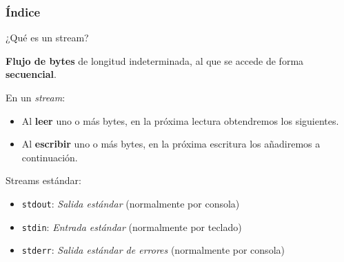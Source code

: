 \documentclass{mybeamer}
\institute{
	{\textsl{\large Tema 10}}
	\\[1em]
	\textbf{\Large Entrada/Salida}
}
\begin{document}
\begin{frame}
\titlepage
\end{frame}

\begin{frame}
\frametitle{Índice}
	\tableofcontents
\end{frame}

\begin{framesec}[Streams]{¿Qué es un stream?}
	\begin{center}
		\textbf{Flujo de bytes} de longitud indeterminada, al que se
		accede de forma \textbf{secuencial}.
	\end{center}
	\vspace{1em}

	En un \textit{stream}:
	\begin{itemize}
		\item Al \textbf{leer} uno o más bytes, en la próxima lectura
			obtendremos los siguientes.
		\item Al \textbf{escribir} uno o más bytes, en la próxima
			escritura los añadiremos a continuación.
	\end{itemize}
	\vspace{1em}

	Streams estándar:
	\begin{itemize}
		\item \texttt{stdout}: \textit{Salida estándar} (normalmente por
			consola)
		\item \texttt{stdin}: \textit{Entrada estándar} (normalmente por
			teclado)
		\item \texttt{stderr}: \textit{Salida estándar de errores}
			(normalmente por consola)
	\end{itemize}
\end{framesec}
\end{document}
